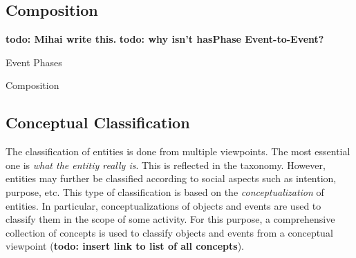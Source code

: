 \subsection{Composition}
\label{sec:composition}

\textbf{todo: Mihai write this.}
\textbf{todo: why isn't hasPhase Event-to-Event?}
\lipsum[2]

\begin{ODP}{Event Phases}
\end{ODP}

\lipsum[2]

\begin{ODP}{Composition}
\end{ODP}

\subsection{Conceptual Classification}
\label{sec:classification}

The classification of entities is done from multiple viewpoints.
The most essential one is \emph{what the entitiy really is}.
This is reflected in the taxonomy.
However, entities may further be classified according to social aspects such as intention, purpose, etc.
This type of classification is based on the \emph{conceptualization} of entities.
In particular, conceptualizations of objects and events are used to classify them in the scope of some activity.
For this purpose,
a comprehensive collection of concepts is used to classify objects and events from a conceptual viewpoint (\textbf{todo: insert link to list of all concepts}).

